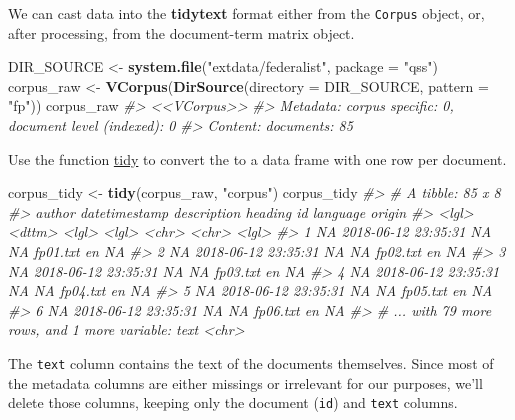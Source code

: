 \documentclass[]{book}
\newenvironment{Shaded}{\begin{snugshade}}{\end{snugshade}}
\newcommand{\KeywordTok}[1]{\textcolor[rgb]{0.13,0.29,0.53}{\textbf{#1}}}
\newcommand{\DataTypeTok}[1]{\textcolor[rgb]{0.13,0.29,0.53}{#1}}
\newcommand{\StringTok}[1]{\textcolor[rgb]{0.31,0.60,0.02}{#1}}
\newcommand{\CommentTok}[1]{\textcolor[rgb]{0.56,0.35,0.01}{\textit{#1}}}
\newcommand{\NormalTok}[1]{#1}
\theoremstyle{definition}
\theoremstyle{definition}
\theoremstyle{definition}
\theoremstyle{remark}
\begin{document}
We can cast data into the \textbf{tidytext} format either from the
\texttt{Corpus} object, or, after processing, from the document-term
matrix object.

\begin{Shaded}
\begin{Highlighting}[]
\NormalTok{DIR_SOURCE <-}\StringTok{ }\KeywordTok{system.file}\NormalTok{(}\StringTok{"extdata/federalist"}\NormalTok{, }\DataTypeTok{package =} \StringTok{"qss"}\NormalTok{)}
\NormalTok{corpus_raw <-}\StringTok{ }\KeywordTok{VCorpus}\NormalTok{(}\KeywordTok{DirSource}\NormalTok{(}\DataTypeTok{directory =}\NormalTok{ DIR_SOURCE, }\DataTypeTok{pattern =} \StringTok{"fp"}\NormalTok{))}
\NormalTok{corpus_raw}
\CommentTok{#> <<VCorpus>>}
\CommentTok{#> Metadata:  corpus specific: 0, document level (indexed): 0}
\CommentTok{#> Content:  documents: 85}
\end{Highlighting}
\end{Shaded}

Use the function
\href{https://www.rdocumentation.org/packages/tidyytext/topics/tidy.Corpus}{tidy}
to convert the to a data frame with one row per document.

\begin{Shaded}
\begin{Highlighting}[]
\NormalTok{corpus_tidy <-}\StringTok{ }\KeywordTok{tidy}\NormalTok{(corpus_raw, }\StringTok{"corpus"}\NormalTok{)}
\NormalTok{corpus_tidy}
\CommentTok{#> # A tibble: 85 x 8}
\CommentTok{#>   author datetimestamp       description heading id       language origin}
\CommentTok{#>   <lgl>  <dttm>              <lgl>       <lgl>   <chr>    <chr>    <lgl> }
\CommentTok{#> 1 NA     2018-06-12 23:35:31 NA          NA      fp01.txt en       NA    }
\CommentTok{#> 2 NA     2018-06-12 23:35:31 NA          NA      fp02.txt en       NA    }
\CommentTok{#> 3 NA     2018-06-12 23:35:31 NA          NA      fp03.txt en       NA    }
\CommentTok{#> 4 NA     2018-06-12 23:35:31 NA          NA      fp04.txt en       NA    }
\CommentTok{#> 5 NA     2018-06-12 23:35:31 NA          NA      fp05.txt en       NA    }
\CommentTok{#> 6 NA     2018-06-12 23:35:31 NA          NA      fp06.txt en       NA    }
\CommentTok{#> # ... with 79 more rows, and 1 more variable: text <chr>}
\end{Highlighting}
\end{Shaded}

The \texttt{text} column contains the text of the documents themselves.
Since most of the metadata columns are either missings or irrelevant for
our purposes, we'll delete those columns, keeping only the document
(\texttt{id}) and \texttt{text} columns.
\end{document}
